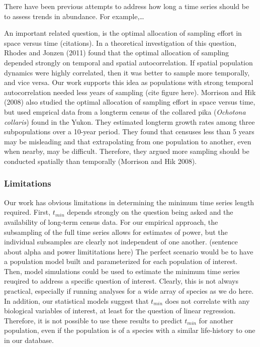 \documentclass[11pt,]{article}
\begin{document}
There have been previous attempts to address how long a time series
should be to assess trends in abundance. For example,\ldots{}

An important related question, is the optimal allocation of sampling
effort in space versus time (citations). In a theoretical investigation
of this question, Rhodes and Jonzen (2011) found that the optimal
allocation of sampling depended strongly on temporal and spatial
autocorrelation. If spatial population dynamics were highly correlated,
then it was better to sample more temporally, and vice versa. Our work
supports this idea as populations with strong temporal autocorrelation
needed less years of sampling (cite figure here). Morrison and Hik
(2008) also studied the optimal allocation of sampling effort in space
versus time, but used emprical data from a longterm census of the
collared pika (\emph{Ochotona collaris}) found in the Yukon. They
estimated longterm growth rates among three subpopulations over a
10-year period. They found that censuses less than 5 years may be
misleading and that extrapolating from one population to another, even
when nearby, may be difficult. Therefore, they argued more sampling
should be conducted spatially than temporally (Morrison and Hik 2008).

\subsubsection{Limitations}\label{limitations}

Our work has obvious limitations in determining the minimum time series
length required. First, \(t_{min}\) depends strongly on the question
being asked and the availability of long-term census data. For our
empirical approach, the subsampling of the full time series allows for
estimates of power, but the individual subsamples are clearly not
independent of one another. (sentence about alpha and power
limititations here) The perfect scenario would be to have a population
model built and parameterized for each population of interest. Then,
model simulations could be used to estimate the minimum time series
reuqired to address a specific question of interest. Clearly, this is
not always practical, especially if running analyses for a wide array of
species as we do here. In addition, our statistical models suggest that
\(t_{min}\) does not correlate with any biological variables of
interest, at least for the question of linear regression. Therefore, it
is not possible to use these results to predict \(t_{min}\) for another
population, even if the population is of a species with a similar
life-history to one in our database.
\end{document}
